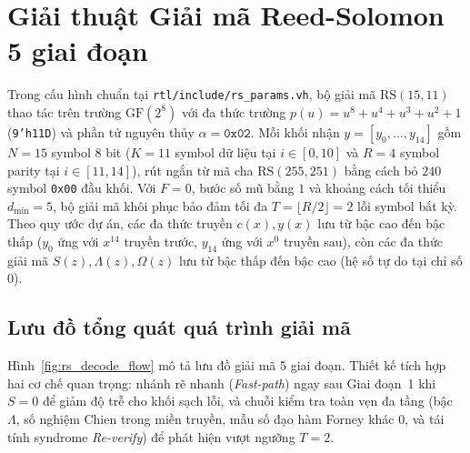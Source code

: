 \section{Giải thuật Giải mã Reed-Solomon 5 giai đoạn}

Trong cấu hình chuẩn tại \texttt{rtl/include/rs\_params.vh}, bộ giải mã $\text{RS}(15,11)$ thao tác trên trường $\text{GF}(2^8)$ với đa thức trường $p(u) = u^8 + u^4 + u^3 + u^2 + 1$ (\texttt{9'h11D}) và phần tử nguyên thủy $\alpha = \texttt{0x02}$. Mỗi khối nhận $y = [y_0, \dots, y_{14}]$ gồm $N = 15$ symbol 8 bit ($K = 11$ symbol dữ liệu tại $i \in [0, 10]$ và $R = 4$ symbol parity tại $i \in [11, 14]$), rút ngắn từ mã cha $\text{RS}(255,251)$ bằng cách bỏ $240$ symbol \texttt{0x00} đầu khối. Với $F = 0$, bước số mũ bằng $1$ và khoảng cách tối thiểu $d_{\min} = 5$, bộ giải mã khôi phục bảo đảm tối đa $T = \lfloor R/2 \rfloor = 2$ lỗi symbol bất kỳ. Theo quy ước dự án, các đa thức truyền $c(x), y(x)$ lưu từ bậc cao đến bậc thấp ($y_0$ ứng với $x^{14}$ truyền trước, $y_{14}$ ứng với $x^0$ truyền sau), còn các đa thức giải mã $S(z), \Lambda(z), \Omega(z)$ lưu từ bậc thấp đến bậc cao (hệ số tự do tại chỉ số $0$).

\subsection{Lưu đồ tổng quát quá trình giải mã}

Hình~\ref{fig:rs_decode_flow} mô tả lưu đồ giải mã 5 giai đoạn. Thiết kế tích hợp hai cơ chế quan trọng: nhánh rẽ nhanh (\textit{Fast-path}) ngay sau Giai đoạn~1 khi $S = 0$ để giảm độ trễ cho khối sạch lỗi, và chuỗi kiểm tra toàn vẹn đa tầng (bậc $\Lambda$, số nghiệm Chien trong miền truyền, mẫu số đạo hàm Forney khác $0$, và tái tính syndrome \textit{Re-verify}) để phát hiện vượt ngưỡng $T = 2$.

